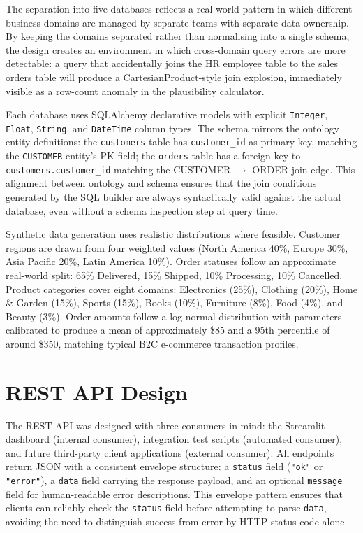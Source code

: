 \documentclass[12pt,a4paper]{report}
\begin{document}
The separation into five databases reflects a real-world pattern in which different business domains are managed by separate teams with separate data ownership. By keeping the domains separated rather than normalising into a single schema, the design creates an environment in which cross-domain query errors are more detectable: a query that accidentally joins the HR employee table to the sales orders table will produce a CartesianProduct-style join explosion, immediately visible as a row-count anomaly in the plausibility calculator.

Each database uses SQLAlchemy declarative models with explicit \texttt{Integer}, \texttt{Float}, \texttt{String}, and \texttt{DateTime} column types. The schema mirrors the ontology entity definitions: the \texttt{customers} table has \texttt{customer\_id} as primary key, matching the \texttt{CUSTOMER} entity's PK field; the \texttt{orders} table has a foreign key to \texttt{customers.customer\_id} matching the CUSTOMER $\to$ ORDER join edge. This alignment between ontology and schema ensures that the join conditions generated by the SQL builder are always syntactically valid against the actual database, even without a schema inspection step at query time.

Synthetic data generation uses realistic distributions where feasible. Customer regions are drawn from four weighted values (North America 40\%, Europe 30\%, Asia Pacific 20\%, Latin America 10\%). Order statuses follow an approximate real-world split: 65\% Delivered, 15\% Shipped, 10\% Processing, 10\% Cancelled. Product categories cover eight domains: Electronics (25\%), Clothing (20\%), Home \& Garden (15\%), Sports (15\%), Books (10\%), Furniture (8\%), Food (4\%), and Beauty (3\%). Order amounts follow a log-normal distribution with parameters calibrated to produce a mean of approximately \$85 and a 95th percentile of around \$350, matching typical B2C e-commerce transaction profiles.

\section{REST API Design}
\label{sec:api-design}

The \ac{REST} \ac{API} was designed with three consumers in mind: the Streamlit dashboard (internal consumer), integration test scripts (automated consumer), and future third-party client applications (external consumer). All endpoints return JSON with a consistent envelope structure: a \texttt{status} field (\texttt{"ok"} or \texttt{"error"}), a \texttt{data} field carrying the response payload, and an optional \texttt{message} field for human-readable error descriptions. This envelope pattern ensures that clients can reliably check the \texttt{status} field before attempting to parse \texttt{data}, avoiding the need to distinguish success from error by HTTP status code alone.
\end{document}
